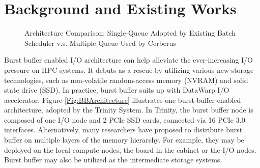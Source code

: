 \section{Background and Existing Works}
\label{Sec:Background}

\begin{figure}[h]
\centering
{}
\caption{Architecture Comparison: Single-Queue Adopted by Existing Batch Scheduler v.s. Multiple-Queue Used by Cerberus}
\label{Fig:CompareSlurmCerberus}
\end{figure}

Burst buffer enabled I/O architecture can help alleviate
the ever-increasing I/O pressure on HPC systems.
It debuts as a rescue by utilizing various new storage technologies,
such as non-volatile random-access memory (NVRAM) and solid state drive (SSD).
In practice, burst buffer suits up with DataWarp I/O accelerator\cite{DataWarp}.
Figure \ref{Fig:BBArchitecture} illustrates one burst-buffer-enabled architecture,
adopted by the Trinity System\cite{TrinitySystem}.
In Trinity, the burst buffer node is composed of one I/O node and 2 PCIe SSD cards,
connected via 16 PCIe 3.0 interfaces.
Alternatively, many researchers have proposed to distribute burst buffer 
on multiple layers of the memory hierarchy\cite{Romanus:CORR:15}.
For example, they may be deployed on the local compute nodes, the board in the cabinet or the I/O nodes.
Burst buffer may also be utilized as the intermediate storage systems.

